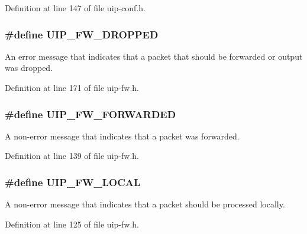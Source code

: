 Definition at line 147 of file uip-\/conf.h.

\hypertarget{group__uipfw_ga5f290389f83e6c58d9e1d037bf284626}{
\subsubsection[{UIP\_\-FW\_\-DROPPED}]{\setlength{\rightskip}{0pt plus 5cm}\#define UIP\_\-FW\_\-DROPPED}}
\label{group__uipfw_ga5f290389f83e6c58d9e1d037bf284626}
An error message that indicates that a packet that should be forwarded or output was dropped. 

Definition at line 171 of file uip-\/fw.h.

\hypertarget{group__uipfw_ga01295e0a76eba8c53265da4264eee50d}{
\subsubsection[{UIP\_\-FW\_\-FORWARDED}]{\setlength{\rightskip}{0pt plus 5cm}\#define UIP\_\-FW\_\-FORWARDED}}
\label{group__uipfw_ga01295e0a76eba8c53265da4264eee50d}
A non-\/error message that indicates that a packet was forwarded. 

Definition at line 139 of file uip-\/fw.h.

\hypertarget{group__uipfw_ga6836699b9dc9e93034c65b748fc1a9d3}{
\subsubsection[{UIP\_\-FW\_\-LOCAL}]{\setlength{\rightskip}{0pt plus 5cm}\#define UIP\_\-FW\_\-LOCAL}}
\label{group__uipfw_ga6836699b9dc9e93034c65b748fc1a9d3}
A non-\/error message that indicates that a packet should be processed locally. 

Definition at line 125 of file uip-\/fw.h.

